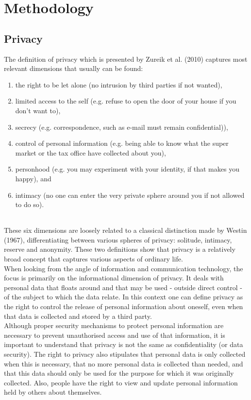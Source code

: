 \section{Methodology}
	
\subsection{Privacy}	
The definition of privacy which is presented by Zureik et al. (2010) captures most relevant dimensions that usually can be found: \\
\begin{enumerate}
	\item the right to be let alone (no intrusion by third parties
	if not wanted),
	\item limited access to the self (e.g. refuse to open the door of your house if you don’t want to), 
	\item secrecy (e.g. correspondence, such as e-mail must remain confidential)),
	\item control of personal information (e.g. being able to know what the super market or the tax	office have collected about you), \item personhood (e.g. you may experiment with your identity,
	if that makes you happy), and 
	\item intimacy (no one can enter the very private sphere around you if not allowed to do so).
\end{enumerate} 
~\\
These six dimensions are loosely related to a classical distinction made by Westin (1967), differentiating between various spheres of privacy: solitude, intimacy, reserve and anonymity. These two definitions show that privacy is a relatively broad concept that captures various aspects of ordinary life.\\
When looking from the angle of information and communication technology, the focus is primarily on the informational dimension of privacy. It deals with personal data that floats	around and that may be used - outside direct control - of the subject to which the data relate. In this context one can define privacy as the right to control the release of personal information about oneself, even when that data is collected and stored by a third party.\\
Although proper security mechanisms to protect personal information are necessary to prevent unauthorised access and use of that information, it is important to understand that privacy
is not the same as confidentiality (or data security). The right to privacy also stipulates that	personal data is only collected when this is necessary, that no more personal data is collected than needed, and that this data should only be used for the purpose for which it was originally	collected. Also, people have the right to view and update personal information held by others about themselves.
	
